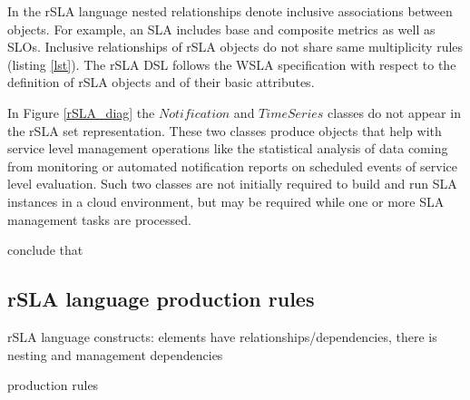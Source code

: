 In the rSLA language nested relationships denote inclusive associations between objects. For example, an SLA includes base and composite metrics as 
well as SLOs. Inclusive relationships of rSLA objects do not share same multiplicity rules (listing \ref{lst}). The rSLA DSL follows the WSLA 
specification \cite{wsla} with respect to the definition of rSLA objects and of their basic attributes.

In Figure \ref{rSLA_diag} the $Notification$ and $TimeSeries$ classes do not appear in the rSLA set representation. These two classes produce objects 
that help with service level management operations like the statistical analysis of data coming from monitoring or automated notification reports on 
scheduled events of service level evaluation. Such two classes are not initially required to build and run SLA instances in a cloud environment, but 
may be required while one or more SLA management tasks are processed.



conclude that
 
\subsection{rSLA language production rules}

rSLA language constructs: elements have relationships/dependencies, there is nesting and management dependencies

production rules